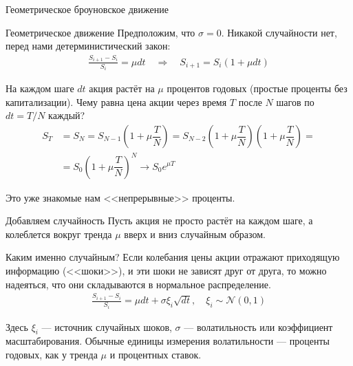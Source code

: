 \documentclass{beamer}
\begin{document}
\begin{frame}{Геометрическое броуновское движение}
\centering
{}
\end{frame}



\begin{frame}{Геометрическое движение}
\justify
Предположим, что $\sigma=0$. Никакой случайности нет, перед нами детерминистический закон:
\begin{align*}
\frac{S_{i+1} - S_i}{S_i} = \mu dt \quad \Rightarrow \quad S_{i+1} = S_i(1 + \mu dt)
\end{align*}

\justify
На каждом шаге $dt$ акция растёт на $\mu$ процентов годовых (простые проценты без капитализации). Чему равна цена акции через время $T$ после $N$ шагов по $dt=T/N$ каждый?
\begin{align*}
S_T &= S_N = S_{N-1}\left(1+\mu\dfrac{T}{N}\right) 
= S_{N-2}\left(1+\mu\dfrac{T}{N}\right)\left(1+\mu\dfrac{T}{N}\right) = \\
&= S_0\left(1+\mu\dfrac{T}{N}\right)^N \to S_0e^{\mu T}
\end{align*}

\justify
Это уже знакомые нам <<непрерывные>> проценты.
\end{frame}



\begin{frame}{Добавляем случайность}
\justify
Пусть акция не просто растёт на каждом шаге, а колеблется вокруг тренда $\mu$ вверх и 
вниз случайным образом.

\justify
Каким именно случайным? Если колебания цены акции отражают
приходящую информацию (<<шоки>>), и эти шоки не зависят друг от друга, то можно 
надеяться, что они складываются в нормальное распределение.
\begin{align*}
\frac{S_{i+1} - S_i}{S_i} = \mu dt + \sigma\xi_i\sqrt{dt}, \quad \xi_i \sim \mathcal{N}(0, 1)
\end{align*}

Здесь $\xi_i$ --- источник случайных шоков, $\sigma$ --- волатильность или коэффициент масштабирования. Обычные единицы измерения волатильности --- проценты годовых, как у тренда $\mu$ и процентных ставок.
\end{frame}
\end{document}
